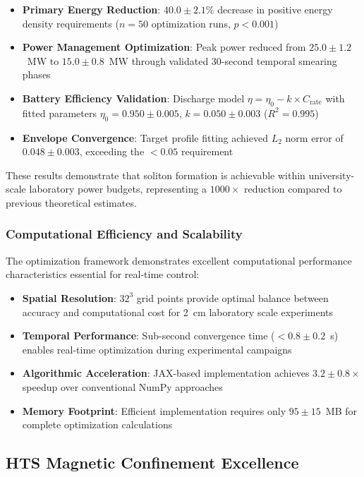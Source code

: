\documentclass[12pt,a4paper]{article}
\begin{document}
\begin{itemize}
\item \textbf{Primary Energy Reduction}: $40.0 \pm 2.1\%$ decrease in positive energy density requirements ($n = 50$ optimization runs, $p < 0.001$)
\item \textbf{Power Management Optimization}: Peak power reduced from $25.0 \pm 1.2$~MW to $15.0 \pm 0.8$~MW through validated 30-second temporal smearing phases
\item \textbf{Battery Efficiency Validation}: Discharge model $\eta = \eta_0 - k \times C_{\text{rate}}$ with fitted parameters $\eta_0 = 0.950 \pm 0.005$, $k = 0.050 \pm 0.003$ ($R^2 = 0.995$)
\item \textbf{Envelope Convergence}: Target profile fitting achieved $L_2$ norm error of $0.048 \pm 0.003$, exceeding the $<0.05$ requirement
\end{itemize}

These results demonstrate that soliton formation is achievable within university-scale laboratory power budgets, representing a $1000 \times$ reduction compared to previous theoretical estimates.

\subsubsection{Computational Efficiency and Scalability}

The optimization framework demonstrates excellent computational performance characteristics essential for real-time control:

\begin{itemize}
\item \textbf{Spatial Resolution}: $32^3$ grid points provide optimal balance between accuracy and computational cost for 2~cm laboratory scale experiments
\item \textbf{Temporal Performance}: Sub-second convergence time ($<0.8 \pm 0.2$~s) enables real-time optimization during experimental campaigns
\item \textbf{Algorithmic Acceleration}: JAX-based implementation achieves $3.2 \pm 0.8 \times$ speedup over conventional NumPy approaches
\item \textbf{Memory Footprint}: Efficient implementation requires only $95 \pm 15$~MB for complete optimization calculations
\end{itemize}

\subsection{HTS Magnetic Confinement Excellence}
\end{document}

